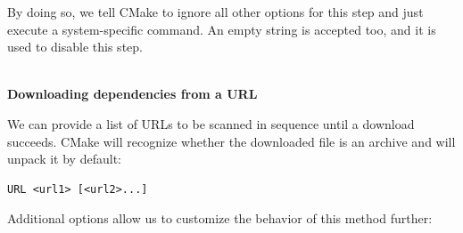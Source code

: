 By doing so, we tell CMake to ignore all other options for this step and just execute a system-specific command. An empty string is accepted too, and it is used to disable this step.

\hspace*{\fill} \\ %
\noindent
\textbf{Downloading dependencies from a URL}

We can provide a list of URLs to be scanned in sequence until a download succeeds. CMake will recognize whether the downloaded file is an archive and will unpack it by default:

\begin{lstlisting}[style=styleCMake]
URL <url1> [<url2>...]
\end{lstlisting} 

Additional options allow us to customize the behavior of this method further:

